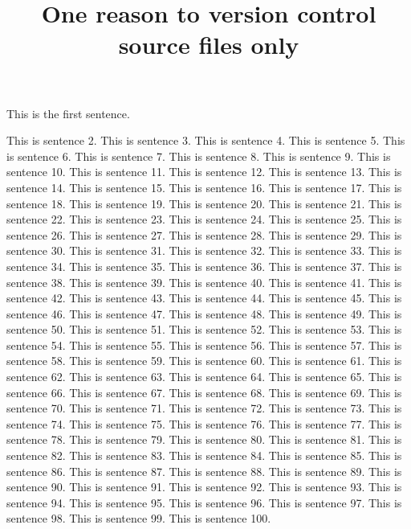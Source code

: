 \documentclass{article}
\title{One reason to version control source files only}
\begin{document}
\maketitle

This is the first sentence.

This is sentence 2.
This is sentence 3.
This is sentence 4.
This is sentence 5.
This is sentence 6.
This is sentence 7.
This is sentence 8.
This is sentence 9.
This is sentence 10.
This is sentence 11.
This is sentence 12.
This is sentence 13.
This is sentence 14.
This is sentence 15.
This is sentence 16.
This is sentence 17.
This is sentence 18.
This is sentence 19.
This is sentence 20.
This is sentence 21.
This is sentence 22.
This is sentence 23.
This is sentence 24.
This is sentence 25.
This is sentence 26.
This is sentence 27.
This is sentence 28.
This is sentence 29.
This is sentence 30.
This is sentence 31.
This is sentence 32.
This is sentence 33.
This is sentence 34.
This is sentence 35.
This is sentence 36.
This is sentence 37.
This is sentence 38.
This is sentence 39.
This is sentence 40.
This is sentence 41.
This is sentence 42.
This is sentence 43.
This is sentence 44.
This is sentence 45.
This is sentence 46.
This is sentence 47.
This is sentence 48.
This is sentence 49.
This is sentence 50.
This is sentence 51.
This is sentence 52.
This is sentence 53.
This is sentence 54.
This is sentence 55.
This is sentence 56.
This is sentence 57.
This is sentence 58.
This is sentence 59.
This is sentence 60.
This is sentence 61.
This is sentence 62.
This is sentence 63.
This is sentence 64.
This is sentence 65.
This is sentence 66.
This is sentence 67.
This is sentence 68.
This is sentence 69.
This is sentence 70.
This is sentence 71.
This is sentence 72.
This is sentence 73.
This is sentence 74.
This is sentence 75.
This is sentence 76.
This is sentence 77.
This is sentence 78.
This is sentence 79.
This is sentence 80.
This is sentence 81.
This is sentence 82.
This is sentence 83.
This is sentence 84.
This is sentence 85.
This is sentence 86.
This is sentence 87.
This is sentence 88.
This is sentence 89.
This is sentence 90.
This is sentence 91.
This is sentence 92.
This is sentence 93.
This is sentence 94.
This is sentence 95.
This is sentence 96.
This is sentence 97.
This is sentence 98.
This is sentence 99.
This is sentence 100.
\end{document}
